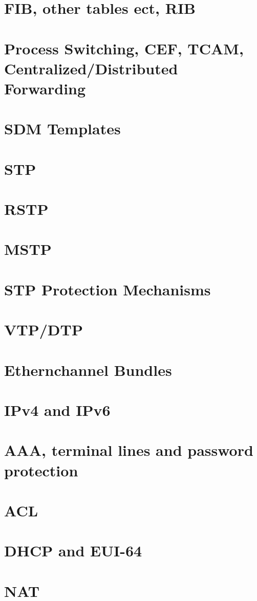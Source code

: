 \documentclass[parindent=0pt]{article}
\begin{document}
\section*{FIB, other tables ect, RIB}
\section*{Process Switching, CEF, TCAM, Centralized/Distributed Forwarding}
\section*{SDM Templates}
\section*{STP}
\section*{RSTP}
\section*{MSTP}
\section*{STP Protection Mechanisms}
\section*{VTP/DTP}
\section*{Ethernchannel Bundles}
\section*{IPv4 and IPv6}
\section*{AAA, terminal lines and password protection}
\section*{ACL}
\section*{DHCP and EUI-64}
\section*{NAT}
\end{document}
